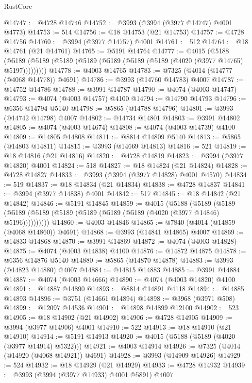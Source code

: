 \begin{lexlean}{RustCore}
\begin{coremodule}
@14747 := @4728 @14746
@14752 := @3993 (@3994 (@3977 @14747) @4001 @4773)
@14753 := 514
@14756 := @18 @14753 (@21 @14753)
@14757 := @4728 @14756
@14760 := @3994 (@3977 @14757) @4001
@14761 := 512
@14764 := @18 @14761 (@21 @14761)
@14765 := @5191 @14764
@14777 := @4015
    (@5188 (@5189 (@5189 (@5189 (@5189 (@5189 (@5189 (@5189 (@4020 (@3977 @14765) @5197)))))))))
@14778 := @4003 @14765
@14783 := @7325 (@4014 (@14777 (@4068 @14778)) @4691)
@14786 := @3993 (@14760 @14783) @4007
@14787 := @14752 @14786
@14788 := @3991 @14787
@14790 := @4074 (@4003 @14747)
@14793 := @4074 (@4003 @14757) @4100
@14794 := @14790 @14793
@14796 := @6356 @14794 @5140
@14798 := @5865 (@14788 @14796)
@14801 := @3993 (@14742 @14798) @4007
@14802 := @14734 @14801
@14803 := @3991 @14802
@14805 := @4074 (@4003 @14674)
@14808 := @4074 (@4003 @14739) @4100
@14809 := @14805 @14808
@14811 := @8814 @14809 @5140
@14813 := @5865 (@14803 @14811)
@14815 := @3993 (@14669 @14813)
@14816 := 521
@14819 := @18 @14816 (@21 @14816)
@14820 := @4728 @14819
@14823 := @3994 (@3977 @14820) @4001
@14824 := 518
@14827 := @18 @14824 (@21 @14824)
@14828 := @4728 @14827
@14833 := @3993 (@3994 (@3977 @14828) @4001 @4570)
@14834 := 519
@14837 := @18 @14834 (@21 @14834)
@14838 := @4728 @14837
@14841 := @3994 (@3977 @14838) @4001
@14842 := 517
@14845 := @18 @14842 (@21 @14842)
@14846 := @5191 @14845
@14859 := @4015
    (@5188
      (@5189 (@5189 (@5189 (@5189 (@5189 (@5189 (@5189 (@5189 (@4020 (@3977 @14846) @5196))))))))))
@14860 := @4003 @14846
@14865 := @7840 (@4014 (@14859 (@4068 @14860)) @4691)
@14868 := @3993 (@14841 @14865) @4007
@14869 := @14833 @14868
@14870 := @3991 @14869
@14872 := @4074 (@4003 @14828)
@14875 := @4074 (@4003 @14838) @4100
@14876 := @14872 @14875
@14878 := @6356 @14876 @5140
@14880 := @5865 (@14870 @14878)
@14883 := @3993 (@14823 @14880) @4007
@14884 := @14815 @14883
@14885 := @3991 @14884
@14887 := @4074 (@4003 @14666)
@14890 := @4074 (@4003 @14820) @4100
@14891 := @14887 @14890
@14893 := @8814 @14891 @4118
@14894 := @14885 @14893
@14896 := @3751 (@14661 @14894)
@14898 := @3968 (@3971 @508)
@14899 := @12097 @14536
@14901 := @14898 @14899 @12100
@14902 := 523
@14905 := @18 @14902 (@21 @14902)
@14906 := @4728 @14905
@14909 := @3994 (@3977 @14906) @4001
@14910 := 522
@14913 := @18 @14910 (@21 @14910)
@14914 := @5191 @14913
@14920 := @4015 (@5188 (@5189 (@4020 (@3977 @14914) @5322)))
@14921 := @4003 @14914
@14926 := @7325 (@4014 (@14920 (@4068 @14921)) @4691)
@14928 := @3993 (@14909 @14926)
@14929 := 524
@14932 := @18 @14929 (@21 @14929)
@14933 := @4728 @14932
@14939 := @3993 (@3994 (@3977 @14933) @4001 @5891) @4007

\end{coremodule}
\end{lexlean}
